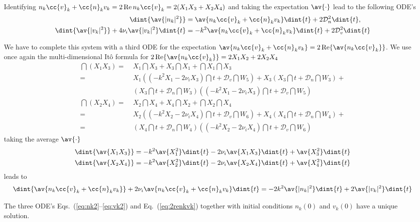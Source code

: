 \documentclass[10pt,a4paper]{article}
\newcommand{\eq}[1]{Eq.~(#1)}
\newcommand{\eqs}[1]{Eqs.~(#1)}
\newcommand{\src}{\ensuremath{\mathcal{D}}}
\begin{document}
Identifying $n_k\cc{v}_k+\cc{n}_kv_k=2\Re n_k\cc{v}_k = 2(X_1X_3+X_2X_4)$
and taking the expectation $\av{\cdot}$ lead to the following ODE's
\begin{align}
\dint{\av{|n_k|^2}} &= \av{n_k\cc{v}_k+\cc{n}_kv_k}\dint{t}+2\src_n^2\dint{t}, \label{eq:nk2}\\
\dint{\av{|v_k|^2}}+4\nu_i\av{|v_k|^2}\dint{t} &= -
k^2\av{n_k\cc{v}_k+\cc{n}_kv_k}\dint{t}+2\src_v^2\dint{t} \label{eq:vk2}
\end{align}

We have to complete this system with a third ODE for the expectation 
$\av{n_k\cc{v}_k+\cc{n}_kv_k}=2\Re\av{n_k\cc{v}_k}$.
We use once again the multi-dimensional Itô formula for $2\Re\av{n_k\cc{v}_k}=2X_1X_2+2X_2X_4$
\begin{align}
\dint{(X_1X_3)}=&\;X_1\dint{X_3}+X_3\dint{X_1}+\dint{X_1}\dint{X_3}\nonumber\\
= &\;
X_1\left(\left(-k^2X_1-2\nu_iX_3\right)\dint{t}+
\src_v\dint{W_5}\right)+X_3\left(X_3\dint{t}+\src_n\dint{W_3}\right)+\nonumber\\
&\; \left(X_3\dint{t}+\src_n\dint{W_3}\right)
\left(\left(-k^2X_1-2\nu_iX_3\right)\dint{t}+
\src_v\dint{W_5}\right)\nonumber\\
\dint{(X_2X_4)}=&\;X_2\dint{X_4}+X_4\dint{X_2}+\dint{X_2}\dint{X_4}\nonumber\\
= &\;
X_2\left(\left(-k^2X_2-2\nu_iX_4\right)\dint{t}+\src_v\dint{W_6}\right)+
X_4\left(X_4\dint{t}+\src_n\dint{W_4}\right)+\nonumber\\
= &\;\left(X_4\dint{t}+\src_n\dint{W_4}\right)
\left(\left(-k^2X_2-2\nu_iX_4\right)\dint{t}+\src_v\dint{W_6}\right)\nonumber
\end{align}
taking the average $\av{\cdot}$ 
\begin{align}
\dint{\av{X_1X_3}}=-k^2\av{X_1^2}\dint{t}-2\nu_i\av{X_1X_3}\dint{t}+
\av{X_3^2}\dint{t}\nonumber\\
\dint{\av{X_2X_4}}=-k^2\av{X_2^2}\dint{t}-2\nu_i\av{X_2X_4}\dint{t}+
\av{X_4^2}\dint{t}\nonumber
\end{align}
leads to
\begin{align}
\dint{\av{n_k\cc{v}_k+\cc{n}_kv_k}}+2\nu_i\av{n_k\cc{v}_k+\cc{n}_kv_k}\dint{t}
=-2k^2\av{|n_k|^2}\dint{t}+2\av{|v_k|^2}\dint{t} \label{eq:2renkvk}
\end{align}

The three ODE's \eqs{\ref{eq:nk2}--\ref{eq:vk2}} and \eq{\ref{eq:2renkvk}} together with initial
conditions $n_k(0)$ and $v_k(0)$ have a unique solution.
\end{document}
